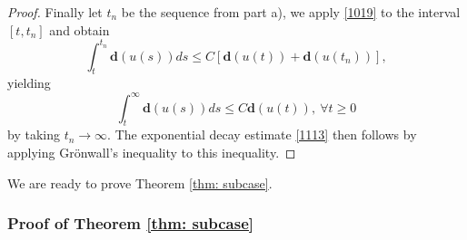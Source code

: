 \documentclass[12pt]{amsart}
\begin{document}
\begin{proof}
Finally let $t_n$ be the sequence from part a), we apply \eqref{1019} to the interval $[t, t_n]$ and obtain
\begin{equation}
\int_{t}^{t_{n}}\mathbf{d}(u(s))ds\leq C[\mathbf{d}(u(t))+\mathbf{d}%
(u(t_{n}))],  \label{decay 0}
\end{equation}%
yielding
\begin{equation*}
\int_{t}^{\infty }\mathbf{d}(u(s))ds\leq C\mathbf{d}(u(t)),\ \forall t\geq 0
\end{equation*}%
by taking $t_n\to \infty$. The exponential decay estimate \eqref{1113} then follows by applying  Gr\"{o}nwall's inequality to this inequality. 
\end{proof}

We are ready to prove Theorem \ref{thm: subcase}.

\subsubsection{Proof of Theorem \protect\ref{thm: subcase}}
\end{document}
